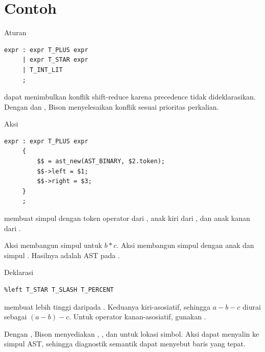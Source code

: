 \section*{Contoh}

\begin{contoh}
Aturan
\begin{lstlisting}[language=Bison]
expr : expr T_PLUS expr
     | expr T_STAR expr
     | T_INT_LIT
     ;
\end{lstlisting}
dapat menimbulkan konflik shift-reduce karena precedence tidak
dideklarasikan. Dengan  dan
, Bison menyelesaikan konflik sesuai prioritas
perkalian.
\end{contoh}

\begin{contoh}
Aksi
\begin{lstlisting}[language=Bison]
expr : expr T_PLUS expr
     {
         $$ = ast_new(AST_BINARY, $2.token);
         $$->left = $1;
         $$->right = $3;
     }
     ;
\end{lstlisting}
membuat simpul  dengan token operator dari ,
anak kiri dari , dan anak kanan dari .
\end{contoh}

\begin{contoh}
Aksi  membangun simpul \code{*} untuk \(b * c\). Aksi
 membangun simpul \code{+} dengan anak  dan
simpul \code{*}. Hasilnya adalah AST pada
.
\end{contoh}

\begin{contoh}
Deklarasi
\begin{lstlisting}[language=Bison]
%left T_PLUS T_MINUS
%left T_STAR T_SLASH T_PERCENT
\end{lstlisting}
membuat \code{*} lebih tinggi daripada \code{+}. Keduanya
kiri-asosiatif, sehingga \(a - b - c\) diurai sebagai
\((a - b) - c\). Untuk operator kanan-asosiatif, gunakan
.
\end{contoh}

\begin{contoh}
Dengan , Bison menyediakan , ,
dan  untuk lokasi simbol. Aksi dapat menyalin
 ke simpul AST, sehingga diagnostik semantik
dapat menyebut baris yang tepat.
\end{contoh}
